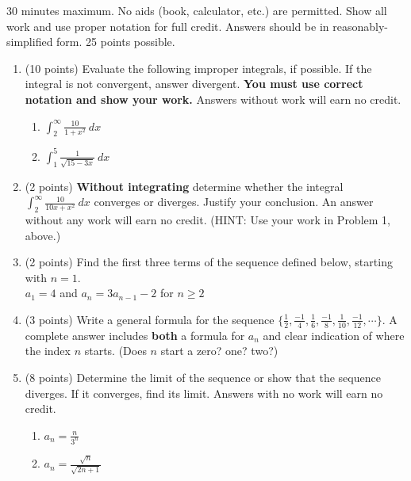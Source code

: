 \documentclass[12pt]{article}
\renewcommand{\emph}[1]{\textsf{\textbf{#1}}}
\newcommand{\ds}{\displaystyle}
\begin{document}
30 minutes maximum.  No aids (book, calculator, etc.) are permitted.  Show all work and use proper notation for full credit.  Answers should be in reasonably-simplified form.  25 points possible.

\begin{enumerate}
\item (10 points) Evaluate the following improper integrals, if possible. If the integral is not convergent, answer divergent. \textbf{You must use correct notation and show your work.} Answers without work will earn no credit.
	\begin{enumerate}
	\item $\ds \int_2^\infty \frac{10}{1+x^2} \: dx$
	\vfill
	\item $\ds \int_1^5\frac{1}{\sqrt{15-3x}} \: dx$
	\vfill
	\end{enumerate}
\item (2 points) \textbf{Without integrating} determine whether the integral $\ds \int_2^\infty \frac{10}{10x+x^2} \: dx$ converges or diverges. Justify your conclusion. An answer without any work will earn no credit. (HINT: Use your work in Problem 1, above.)
\vfill
\newpage
\item (2 points) Find the first three terms of the sequence defined below, starting with $n=1.$\\

\hspace{2in} $a_1=4$ and $a_n=3a_{n-1} -2$ for $n\geq 2$

\vfill
 
\item (3 points) Write a general formula for the sequence $\ds \{\frac{1}{2}, \frac{-1}{4}, \frac{1}{6}, \frac{-1}{8},\frac{ 1}{10}, \frac{-1}{12}, \cdots\}.$ A complete answer includes \emph{both} a formula for $a_n$ and clear indication of where the index $n$ starts. (Does $n$ start a zero? one? two?)
\vfill
\item (8 points) Determine the limit of the sequence or show that the sequence diverges. If it converges, find its limit. Answers with no work will earn no credit.
	\begin{enumerate}
	\item $a_n=\frac{n}{3^n}$
	\vfill
	\item $a_n=\frac{\sqrt{n}}{\sqrt{2n+1}}$
	\vfill
	\end{enumerate}
\end{enumerate}
\end{document}
